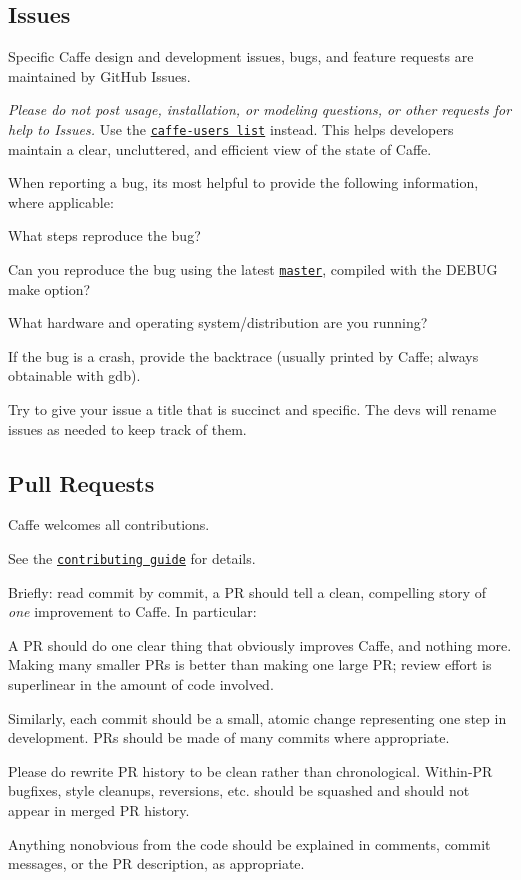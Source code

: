 \subsection*{Issues}

Specific Caffe design and development issues, bugs, and feature requests are maintained by Git\+Hub Issues.

{\itshape Please do not post usage, installation, or modeling questions, or other requests for help to Issues.} Use the \href{https://groups.google.com/forum/#!forum/caffe-users}{\tt caffe-\/users list} instead. This helps developers maintain a clear, uncluttered, and efficient view of the state of Caffe.

When reporting a bug, it\textquotesingle{}s most helpful to provide the following information, where applicable\+:


\begin{DoxyItemize}
\item What steps reproduce the bug?
\item Can you reproduce the bug using the latest \href{https://github.com/BVLC/caffe/tree/master}{\tt master}, compiled with the {\ttfamily D\+E\+B\+UG} make option?
\item What hardware and operating system/distribution are you running?
\item If the bug is a crash, provide the backtrace (usually printed by Caffe; always obtainable with {\ttfamily gdb}).
\end{DoxyItemize}

Try to give your issue a title that is succinct and specific. The devs will rename issues as needed to keep track of them.

\subsection*{Pull Requests}

Caffe welcomes all contributions.

See the \href{http://caffe.berkeleyvision.org/development.html}{\tt contributing guide} for details.

Briefly\+: read commit by commit, a PR should tell a clean, compelling story of {\itshape one} improvement to Caffe. In particular\+:


\begin{DoxyItemize}
\item A PR should do one clear thing that obviously improves Caffe, and nothing more. Making many smaller P\+Rs is better than making one large PR; review effort is superlinear in the amount of code involved.
\item Similarly, each commit should be a small, atomic change representing one step in development. P\+Rs should be made of many commits where appropriate.
\item Please do rewrite PR history to be clean rather than chronological. Within-\/\+PR bugfixes, style cleanups, reversions, etc. should be squashed and should not appear in merged PR history.
\item Anything nonobvious from the code should be explained in comments, commit messages, or the PR description, as appropriate. 
\end{DoxyItemize}
